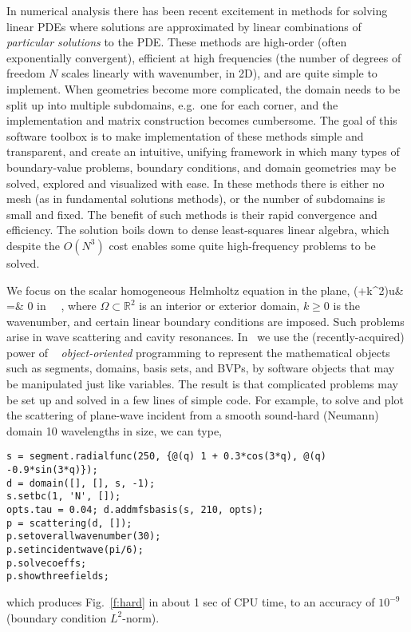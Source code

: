\documentclass[12pt]{article}
\begin{document}
In numerical analysis there has been recent excitement
in methods for solving linear PDEs where solutions are approximated by
linear combinations of {\em particular solutions} to the PDE.
These methods are high-order (often exponentially convergent),
efficient at high frequencies (the number of degrees of freedom $N$
scales linearly with wavenumber, in 2D),
and are quite simple to implement.
When geometries become more complicated, the domain needs to be split
up into multiple subdomains, e.g.\ one for each corner, and the
implementation and matrix construction becomes cumbersome.
The goal of this software toolbox is to make implementation of
these methods simple
and transparent, and create an intuitive, unifying framework in which many
types of boundary-value problems,
boundary conditions, and domain geometries
may be solved, explored and visualized with ease.
In these methods there is either no mesh (as in
fundamental solutions methods), or
the number of subdomains is small and fixed.
The benefit of such methods is their rapid convergence and efficiency.
The solution boils down to dense least-squares linear algebra,
which despite the $O(N^3)$ cost enables some quite high-frequency problems
to be solved.

We focus on the scalar homogeneous
Helmholtz equation in the plane,
\bea
(\Delta+k^2)u& =& 0 \qquad \mbox{in } \Omega~,
\eea
where $\Omega \subset \mathbb{R}^2$ is an interior or exterior
domain, $k\ge 0$ is the wavenumber, and certain
linear boundary conditions are imposed.
Such problems arise in wave scattering and cavity resonances.
In \mpspack\ we use the (recently-acquired)
power of \matlab\ \cite{matlab} {\em object-oriented}
programming to represent the 
mathematical objects such as segments, domains,
basis sets, and BVPs, by software objects that may be manipulated
just like variables.
The result is that complicated problems may be set up and solved in
a few lines of simple code.
For example, to solve and plot the scattering
of plane-wave incident from a smooth sound-hard (Neumann) domain
10 wavelengths in size, we can type,
\begin{verbatim}
s = segment.radialfunc(250, {@(q) 1 + 0.3*cos(3*q), @(q) -0.9*sin(3*q)});
d = domain([], [], s, -1);
s.setbc(1, 'N', []);
opts.tau = 0.04; d.addmfsbasis(s, 210, opts);
p = scattering(d, []);
p.setoverallwavenumber(30);
p.setincidentwave(pi/6);
p.solvecoeffs;
p.showthreefields;
\end{verbatim}
which produces Fig.~\ref{f:hard} in about 1 sec of CPU time,
to an accuracy of $10^{-9}$ (boundary condition $L^2$-norm).
\end{document}
